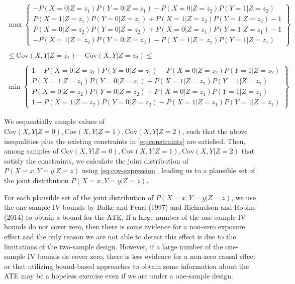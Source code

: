 \documentclass[
]{article}
\theoremstyle{plain}
\begin{document}
\[
\begin{aligned}
  \max\left\{
      \begin{array}{c}
        -P(X = 0 | Z = z_1)P(Y = 0 | Z = z_1) - P(X = 0 | Z = z_2)P(Y = 1 | Z = z_2) \\
        P(X = 1 | Z = z_1)P(Y = 0 | Z = z_1) + P(X = 1 | Z = z_2)P(Y = 1 | Z = z_2) -1 \\
        P(X = 0 | Z = z_2)P(Y = 0 | Z = z_2) + P(X = 0 | Z = z_1)P(Y = 1 | Z = z_1) - 1 \\
        -P(X = 1 | Z = z_2)P(Y = 0 | Z = z_2) - P(X = 1 | Z = z_1)P(Y = 1 | Z = z_1)
      \end{array}
    \right\} \qquad \qquad & \\ \\
    \le \text{Cov}(X,Y | Z = z_1) - \text{Cov}(X,Y | Z = z_2) \le \qquad \qquad \qquad \qquad  \qquad& \\ \\
    \min\left\{
      \begin{array}{c}
        1 -P(X = 0 | Z = z_1)P(Y = 0 | Z = z_1) - P(X = 0 | Z = z_2)P(Y = 1 | Z = z_2) \\
        P(X = 1 | Z = z_1)P(Y = 0 | Z = z_1) + P(X = 1 | Z = z_2)P(Y = 1 | Z = z_2) \\
        P(X = 0 | Z = z_2)P(Y = 0 | Z = z_2) + P(X = 0 | Z = z_1)P(Y = 1 | Z = z_1) \\
        1 - P(X = 1 | Z = z_2)P(Y = 0 | Z = z_2) - P(X = 1 | Z = z_1)P(Y = 1 | Z = z_1)
      \end{array}
    \right\} &
\end{aligned}
\]

We sequentially sample values of \(\text{Cov}(X, Y | Z = 0), \text{Cov}(X, Y | Z = 1), \text{Cov}(X, Y | Z = 2)\), such that the above inequalities plus the existing constraints in \eqref{eq:constraints} are satisfied. Then, among samples of \(\text{Cov}(X, Y | Z = 0), \text{Cov}(X, Y | Z = 1), \text{Cov}(X, Y | Z = 2)\) that satisfy the constraints, we calculate the joint distribution of \(P(X = x, Y = y | Z = z)\) using \eqref{eq:cov-expression}, leading us to a plausible set of the joint distribution \(P(X = x, Y = y | Z = z)\).

For each plausible set of the joint distribution of \(P(X = x, Y = y | Z = z)\), we use the one-sample IV bounds by Balke and Pearl (1997) and Richardson and Robins (2014) to obtain a bound for the ATE. If a large number of the one-sample IV bounds do not cover zero, then there is some evidence for a non-zero exposure effect and the only reason we are not able to detect this effect is due to the limitations of the two-sample design. However, if a large number of the one-sample IV bounds do cover zero, there is less evidence for a non-zero causal effect or that utilizing bound-based approaches to obtain some information about the ATE may be a hopeless exercise even if we are under a one-sample design.
\end{document}
